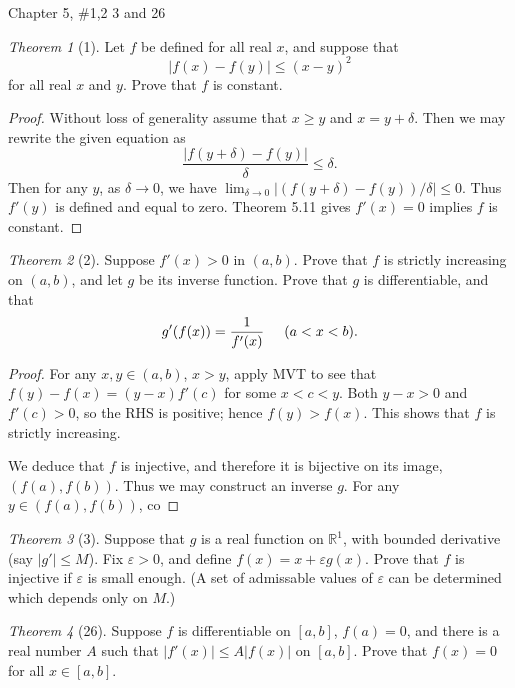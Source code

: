 \documentclass[12pt]{article}
\theoremstyle{remark}
\theoremstyle{named}
\newtheorem*{theorem}{Theorem}
\newcommand{\e}{\varepsilon}
\newcommand{\R}{\mathbb R}
\begin{document}
Chapter 5, \#1,2 3 and 26
\begin{theorem}[1]
    Let \(f\) be defined for all real \(x\), and suppose that 
    \[|f(x) - f(y)| \le (x - y)^2\]
    for all real \(x\) and \(y\). Prove that \(f\) is constant.
\end{theorem}

\begin{proof}
    Without loss of generality assume that \(x \ge y\) and \(x = y + \delta\). Then we may rewrite the given equation as
    \[\frac{|f(y + \delta) - f(y)|}{\delta} \le \delta.\]
    Then for any \(y\), as \(\delta \to 0\), we have \(\lim_{\delta \to 0} |(f(y + \delta) - f(y)) / \delta| \le 0\). Thus \(f'(y)\) is defined and equal to zero. Theorem 5.11 gives \(f'(x) = 0\) implies \(f\) is constant.
\end{proof}

\begin{theorem}[2]
    Suppose \(f'(x) > 0\) in \((a, b)\). Prove that \(f\) is strictly increasing on \((a, b)\), and let \(g\) be its inverse function. Prove that \(g\) is differentiable, and that 
    \[g'(f(x)) = \frac{1}{f'(x)} \hspace{5mm} (a < x < b).\]
\end{theorem}

\begin{proof}
    For any \(x, y \in (a, b)\), \(x > y\), apply MVT to see that \(f(y) - f(x) = (y - x)f'(c)\) for some \(x < c < y\). Both \(y - x > 0\) and \(f'(c) > 0\), so the RHS is positive; hence \(f(y) > f(x)\). This shows that \(f\) is strictly increasing.

    We deduce that \(f\) is injective, and therefore it is bijective on its image, \((f(a), f(b))\). Thus we may construct an inverse \(g\). For any \(y \in (f(a), f(b))\), co
\end{proof}

\begin{theorem}[3]
    Suppose that \(g\) is a real function on \(\R^1\), with bounded derivative (say \(|g'| \le M\)). Fix \(\e > 0\), and define \(f(x) = x + \e g(x)\). Prove that \(f\) is injective if \(\e\) is small enough. (A set of admissable values of \(\e\) can be determined which depends only on \(M\).)
\end{theorem}

\begin{theorem}[26]
    Suppose \(f\) is differentiable on \([a, b]\), \(f(a) = 0\), and there is a real number \(A\) such that \(|f'(x)| \le A|f(x)|\) on \([a, b]\). Prove that \(f(x) = 0\) for all \(x \in [a, b]\). 
\end{theorem}
\end{document}
